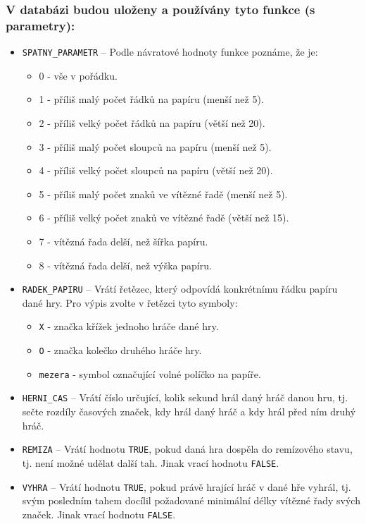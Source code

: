 \documentclass[
11pt,
a4paper,
pdftex,
czech,
titlepage
]{report}
\begin{document}
\subsubsection{V databázi budou uloženy a používány tyto funkce (s parametry):}
\begin{itemize}
    \item \texttt{SPATNY\_PARAMETR} -- Podle návratové hodnoty funkce poznáme, že je:
    \begin{itemize}
        \item 0 - vše v pořádku.
        \item 1 - příliš malý počet řádků na papíru (menší než 5).
        \item 2 - příliš velký počet řádků na papíru (větší než 20).
        \item 3 - příliš malý počet sloupců na papíru (menší než 5).
        \item 4 - příliš velký počet sloupců na papíru (větší než 20).
        \item 5 - příliš malý počet znaků ve vítězné řadě (menší než 5).
        \item 6 - příliš velký počet znaků ve vítězné řadě (větší než 15).
        \item 7 - vítězná řada delší, než šířka papíru.
        \item 8 - vítězná řada delší, než výška papíru.
    \end{itemize}

    \item \texttt{RADEK\_PAPIRU} -- Vrátí řetězec, který odpovídá konkrétnímu řádku papíru dané hry. Pro výpis zvolte v řetězci tyto symboly:
    \begin{itemize}
        \item \texttt{X} - značka křížek jednoho hráče dané hry.
        \item \texttt{O} - značka kolečko druhého hráče hry.
        \item \texttt{mezera} - symbol označující volné políčko na papíře.
    \end{itemize}
    \item \texttt{HERNI\_CAS} -- Vrátí číslo určující, kolik sekund hrál daný hráč danou hru, tj. sečte rozdíly časových značek, kdy hrál daný hráč a kdy hrál před ním druhý hráč.
    \item \texttt{REMIZA} -- Vrátí hodnotu \texttt{TRUE}, pokud daná hra dospěla do remízového stavu, tj. není možné udělat další tah. Jinak vrací hodnotu \texttt{FALSE}.
    \item \texttt{VYHRA} -- Vrátí hodnotu \texttt{TRUE}, pokud právě hrající hráč v dané hře vyhrál, tj. svým posledním tahem docílil požadované minimální délky vítězné řady svých značek. Jinak vrací hodnotu \texttt{FALSE}.
\end{itemize}
\end{document}
